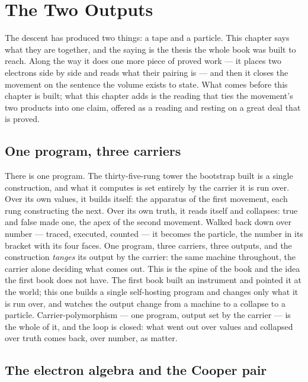 \chapter{The Two Outputs}
\label{chap:the-two-outputs}

The descent has produced two things: a tape and a particle. This chapter says what they are together, and
the saying is the thesis the whole book was built to reach. Along the way it does one more piece of proved
work --- it places two electrons side by side and reads what their pairing is --- and then it closes the
movement on the sentence the volume exists to state. What comes before this chapter is built; what this
chapter adds is the reading that ties the movement's two products into one claim, offered as a reading and
resting on a great deal that is proved.

\section{One program, three carriers}
\label{se:one-program-three-carriers}

There is one program. The thirty-five-rung tower the bootstrap built is a single construction, and what it
computes is set entirely by the carrier it is run over. Over its own values, it builds itself: the apparatus
of the first movement, each rung constructing the next. Over its own truth, it reads itself and collapses:
true and false made one, the apex of the second movement. Walked back down over number --- traced,
executed, counted --- it becomes the particle, the number in its bracket with its four faces. One program,
three carriers, three outputs, and the construction \emph{tanges} its output by the carrier: the same
machine throughout, the carrier alone deciding what comes out. This is the spine of the book and the idea the
first book does not have. The first book built an instrument and pointed it at the world; this one builds a
single self-hosting program and changes only what it is run over, and watches the output change from a
machine to a collapse to a particle. Carrier-polymorphism --- one program, output set by the carrier --- is
the whole of it, and the loop is closed: what went out over values and collapsed over truth comes back, over
number, as matter.

\section{The electron algebra and the Cooper pair}
\label{se:electron-algebra-cooper-pair}

